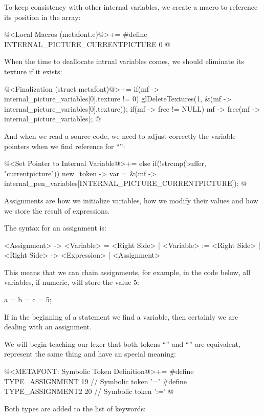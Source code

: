 To keep consistency with other internal variables, we create a macro
to reference its position in the array:

\iniciocodigo
@<Local Macros (metafont.c)@>+=
#define INTERNAL_PICTURE_CURRENTPICTURE 0
@
\fimcodigo

When the time to deallocate intrnal variables comes, we should
eliminate its texture if it exists:

\iniciocodigo
@<Finalization (struct metafont)@>+=
if(mf -> internal_picture_variables[0].texture != 0)
  glDeleteTextures(1, &(mf -> internal_picture_variables[0].texture));
if(mf -> free != NULL)
  mf -> free(mf -> internal_picture_variables);
@
\fimcodigo

And when we read a source code, we need to adjust correctly the
variable pointers when we find reference for
``'':

\iniciocodigo
@<Set Pointer to Internal Variable@>+=
else if(!strcmp(buffer, "currentpicture"))
  new_token -> var =
          &(mf -> internal_pen_variables[INTERNAL_PICTURE_CURRENTPICTURE]);
@
\fimcodigo





Assignments are how we initialize variables, how we modify their
values and how we store the result of expressions.

The syntax for an assignment is:

\alinhaverbatim
<Assignment> -> <Variable> = <Right Side> |
                <Variable> := <Right Side> |
<Right Side> -> <Expression> | <Assignment>
\alinhanormal

This means that we can chain assignments, for example, in the code
below, all variables, if numeric, will store the value 5:

\alinhaverbatim
a = b = c = 5;
\alinhanormal

If in the beginning of a statement we find a variable, then certainly
we are dealing with an assignment.

We will begin teaching our lexer that both tokens ``\monoespaco{=}''
and ``\monoespaco{:=}'' are equivalent, represent the same thing and
have an special meaning:

\iniciocodigo
@<METAFONT: Symbolic Token Definition@>+=
#define TYPE_ASSIGNMENT            19 // Symbolic token '='
#define TYPE_ASSIGNMENT2           20 // Symbolic token ':='
@
\fimcodigo

Both types are added to the list of keywords:

